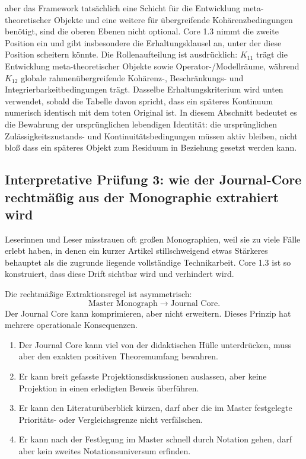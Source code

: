aber das Framework tatsächlich eine Schicht für die Entwicklung meta-theoretischer Objekte und eine weitere
für übergreifende Kohärenzbedingungen benötigt, sind die oberen Ebenen nicht optional. Core 1.3 nimmt die
zweite Position ein und gibt insbesondere die Erhaltungsklausel an, unter der diese Position scheitern
könnte.
Die Rollenaufteilung ist ausdrücklich: \(K_{11}\) trägt die Entwicklung meta-theoretischer Objekte sowie
Operator-/Modellräume, während \(K_{12}\) globale rahmenübergreifende Kohärenz-, Beschränkungs- und
Integrierbarkeitbedingungen trägt. Dasselbe Erhaltungskriterium wird unten verwendet, sobald die Tabelle
davon spricht, dass ein späteres Kontinuum numerisch identisch mit dem toten Original ist. In diesem
Abschnitt bedeutet es die Bewahrung der ursprünglichen lebendigen Identität: die ursprünglichen
Zulässigkeitszustands- und Kontinuitätsbedingungen müssen aktiv bleiben, nicht bloß dass ein späteres Objekt
zum Residuum in Beziehung gesetzt werden kann.

\subsection{Interpretative Prüfung 3: wie der Journal-Core rechtmäßig aus der Monographie extrahiert wird}

Leserinnen und Leser misstrauen oft großen Monographien, weil sie zu viele Fälle erlebt haben, in denen ein
kurzer Artikel stillschweigend etwas Stärkeres behauptet als die zugrunde liegende vollständige
Technikarbeit. Core 1.3 ist so konstruiert, dass diese Drift sichtbar wird und verhindert wird.

Die rechtmäßige Extraktionsregel ist asymmetrisch:
\[
\text{Master Monograph} \longrightarrow \text{Journal Core}.
\]
Der Journal Core kann komprimieren, aber nicht erweitern. Dieses Prinzip hat mehrere operationale
Konsequenzen.

\begin{enumerate}
\item Der Journal Core kann viel von der didaktischen Hülle unterdrücken, muss aber den exakten positiven
      Theoremumfang bewahren.
\item Er kann breit gefasste Projektionsdiskussionen auslassen, aber keine Projektion in einen erledigten
      Beweis überführen.
\item Er kann den Literaturüberblick kürzen, darf aber die im Master festgelegte Prioritäts- oder
      Vergleichsgrenze nicht verfälschen.
\item Er kann nach der Festlegung im Master schnell durch Notation gehen, darf aber kein zweites
      Notationsuniversum erfinden.
\end{enumerate}

